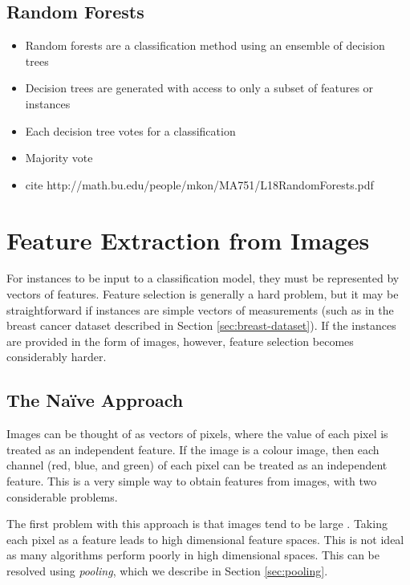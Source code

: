     \subsection{Random Forests}
    \label{sec:random-forests}

        \begin{itemize}
            \item Random forests are a classification method using an ensemble of decision trees
            \item Decision trees are generated with access to only a subset of features or instances
            \item Each decision tree votes for a classification
            \item Majority vote
            \item cite http://math.bu.edu/people/mkon/MA751/L18RandomForests.pdf
        \end{itemize}

\section{Feature Extraction from Images}
\label{sec:image-features}
    
    For instances to be input to a classification model, they must be
    represented by vectors of features. Feature selection is generally a hard
    problem, but it may be straightforward if instances are simple vectors of
    measurements (such as in the breast cancer dataset described in Section
    \ref{sec:breast-dataset}). If the instances are provided in the form of
    images, however, feature selection becomes considerably harder.

    \subsection{The Na\"ive Approach}
    \label{sec:naive-approach-image-features}

        Images can be thought of as vectors of pixels, where the value of each
        pixel is treated as an independent feature. If the image is a colour
        image, then each channel (red, blue, and green) of each pixel can be
        treated as an independent feature. This is a very simple way to obtain
        features from images, with two considerable problems.

        The first problem with this approach is that images tend to be large  \citep{lecun98}.
        Taking each pixel as a feature leads to high dimensional feature spaces.
        This is not ideal as many algorithms perform poorly in high dimensional
        spaces. This can be resolved using \emph{pooling}, which we describe in
        Section \ref{sec:pooling}.


